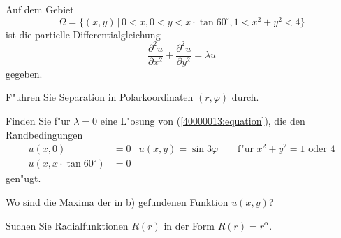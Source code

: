 Auf dem Gebiet 
\[
\Omega = \{(x,y)\,|\, 0<x, 0 < y < x\cdot \tan 60^\circ, 1 < x^2 +y^2 < 4\}
\]
ist die partielle Differentialgleichung
\begin{equation}
\frac{\partial^2u}{\partial x^2}
+
\frac{\partial^2u}{\partial y^2}
=
\lambda u
\label{40000013:equation}
\end{equation}
gegeben.
\begin{teilaufgaben}
\item
F"uhren Sie Separation in Polarkoordinaten $(r,\varphi)$ durch.
\item
Finden Sie f"ur $\lambda=0$ eine L"osung von (\ref{40000013:equation}), die
den Randbedingungen
\begin{align*}
u(x,0)&=0&u(x,y)=\sin3\varphi\qquad \text{f"ur $x^2+y^2=1$ oder $4$}\\
u(x,x\cdot \tan 60^\circ)&=0
\end{align*}
gen"ugt.
\item
Wo sind die Maxima der in b) gefundenen Funktion $u(x,y)$?
\end{teilaufgaben}

\begin{hinweis}
Suchen Sie Radialfunktionen $R(r)$ in der Form $R(r)=r^\alpha$.
\end{hinweis}

